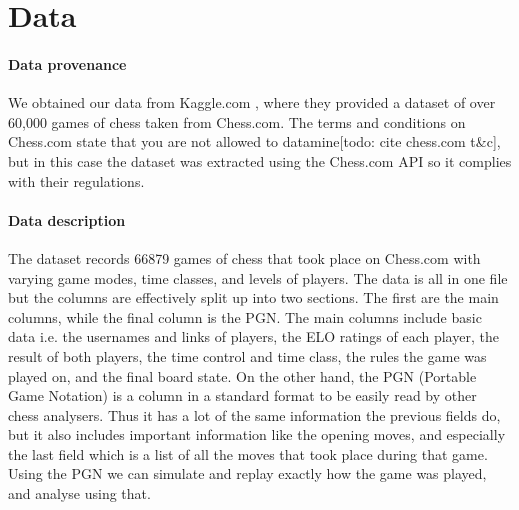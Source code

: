 \documentclass[10pt,a4paper,twocolumn]{article}
\begin{document}
\section{Data}


\paragraph{Data provenance}
We obtained our data from Kaggle.com \cite{Kaggle}, where they provided a dataset of over 60,000 games of chess taken from Chess.com. The terms and conditions on Chess.com state that you are not allowed to datamine[todo: cite chess.com t\&c], but in this case the dataset was extracted using the Chess.com API so it complies with their regulations.

\paragraph{Data description}
The dataset records 66879 games of chess that took place on Chess.com with varying game modes, time classes, and levels of players. The data is all in one file but the columns are effectively split up into two sections. The first are the main columns, while the final column is the PGN. The main columns include basic data i.e. the usernames and links of players, the ELO ratings of each player, the result of both players, the time control and time class, the rules the game was played on, and the final board state. On the other hand, the PGN (Portable Game Notation) is a column in a standard format to be easily read by other chess analysers. Thus it has a lot of the same information the previous fields do, but it also includes important information like the opening moves, and especially the last field which is a list of all the moves that took place during that game. Using the PGN we can simulate and replay exactly how the game was played, and analyse using that.

\end{document}
